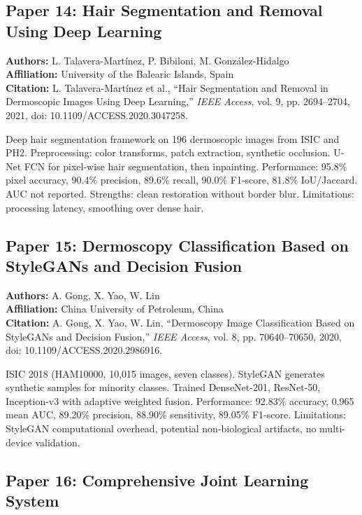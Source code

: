 \documentclass[conference]{IEEEtran}
\begin{document}
\subsection{Paper 14: Hair Segmentation and Removal Using Deep Learning}

\noindent\textbf{Authors:} L. Talavera-Martínez, P. Bibiloni, M. González-Hidalgo\\
\textbf{Affiliation:} University of the Balearic Islands, Spain\\
\textbf{Citation:} L. Talavera-Martínez et al., ``Hair Segmentation and Removal in Dermoscopic Images Using Deep Learning,'' \textit{IEEE Access}, vol. 9, pp. 2694--2704, 2021, doi: 10.1109/ACCESS.2020.3047258.

Deep hair segmentation framework on 196 dermoscopic images from ISIC and PH2. Preprocessing: color transforms, patch extraction, synthetic occlusion. U-Net FCN for pixel-wise hair segmentation, then inpainting. Performance: 95.8\% pixel accuracy, 90.4\% precision, 89.6\% recall, 90.0\% F1-score, 81.8\% IoU/Jaccard. AUC not reported. Strengths: clean restoration without border blur. Limitations: processing latency, smoothing over dense hair.

\subsection{Paper 15: Dermoscopy Classification Based on StyleGANs and Decision Fusion}

\noindent\textbf{Authors:} A. Gong, X. Yao, W. Lin\\
\textbf{Affiliation:} China University of Petroleum, China\\
\textbf{Citation:} A. Gong, X. Yao, W. Lin, ``Dermoscopy Image Classification Based on StyleGANs and Decision Fusion,'' \textit{IEEE Access}, vol. 8, pp. 70640--70650, 2020, doi: 10.1109/ACCESS.2020.2986916.

ISIC 2018 (HAM10000, 10,015 images, seven classes). StyleGAN generates synthetic samples for minority classes. Trained DenseNet-201, ResNet-50, Inception-v3 with adaptive weighted fusion. Performance: 92.83\% accuracy, 0.965 mean AUC, 89.20\% precision, 88.90\% sensitivity, 89.05\% F1-score. Limitations: StyleGAN computational overhead, potential non-biological artifacts, no multi-device validation.

\subsection{Paper 16: Comprehensive Joint Learning System}
\end{document}
